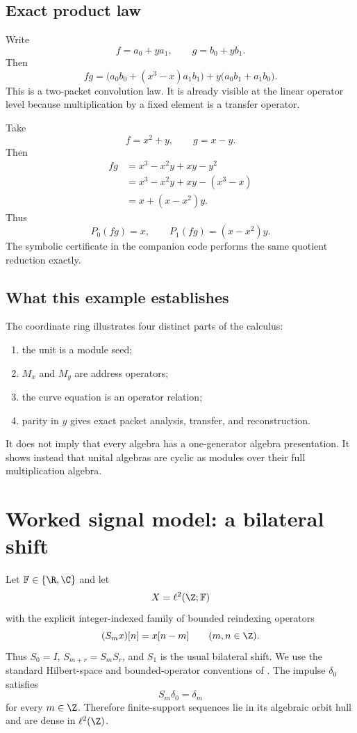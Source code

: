 \subsection{Exact product law}

Write
\[
f=a_0+ya_1,
\qquad
g=b_0+yb_1.
\]
Then
\[
{
fg
=
\bigl(a_0b_0+(x^3-x)a_1b_1\bigr)
+
y\bigl(a_0b_1+a_1b_0\bigr).
}
\]
This is a two-packet convolution law. It is already visible at the linear operator level because multiplication by a fixed element is a transfer operator.

\begin{example}
Take
\[
f=x^2+y,
\qquad
g=x-y.
\]
Then
\[
\begin{aligned}
fg
&=x^3-x^2y+xy-y^2\\
&=x^3-x^2y+xy-(x^3-x)\\
&=x+(x-x^2)y.
\end{aligned}
\]
Thus
\[
P_0(fg)=x,
\qquad
P_1(fg)=(x-x^2)y.
\]
The symbolic certificate in the companion code performs the same quotient reduction exactly.
\end{example}

\subsection{What this example establishes}

The coordinate ring illustrates four distinct parts of the calculus:
\begin{enumerate}[label=(\roman*)]
\item the unit is a module seed;
\item $M_x$ and $M_y$ are address operators;
\item the curve equation is an operator relation;
\item parity in $y$ gives exact packet analysis, transfer, and reconstruction.
\end{enumerate}
It does not imply that every algebra has a one-generator algebra presentation. It shows instead that unital algebras are cyclic as modules over their full multiplication algebra.

\section{Worked signal model: a bilateral shift}

Let $\mathbb{F}\in\{\R,\C\}$ and let
\[
X=\ell^2(\Z;\mathbb F)
\]
with the explicit integer-indexed family of bounded reindexing operators
\[
(S_mx)[n]=x[n-m]
\qquad(m,n\in\Z).
\]
Thus $S_0=I$, $S_{m+r}=S_mS_r$, and $S_1$ is the usual bilateral shift. We use the standard Hilbert-space and bounded-operator conventions of \cite{conway1990}.
The impulse $\delta_0$ satisfies
\[
S_m\delta_0=\delta_m
\]
for every $m\in\Z$. Therefore finite-support sequences lie in its algebraic orbit hull and are dense in $\ell^2(\Z)$.

